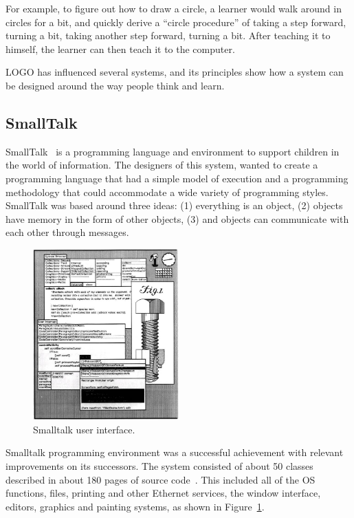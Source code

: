 For example, to figure out how to draw a circle, a learner would walk around in circles for a bit, and quickly derive a ``circle procedure'' of taking a step forward, turning a bit, taking another step forward, turning a bit. After teaching it to himself, the learner can then teach it to the computer. 

LOGO has influenced several systems, and its principles show how a system can be designed around the way people think and learn.
\subsection{SmallTalk}
\label{subsec:smalltalk}
SmallTalk~\citep{Kay1993} is a programming language and environment to support children in the world of information. The designers of this system, wanted to create a programming language that had a simple model of execution and a programming methodology that could accommodate a wide variety of programming styles. SmallTalk was based around three ideas: (1) everything is an object, (2) objects have memory in the form of other objects, (3) and objects can communicate with each other through messages.

\begin{figure}
  \centering
  \includegraphics[width=0.5\textwidth]{images/smalltalk}
    \caption{Smalltalk user interface.}
    \vspace{-20pt}  
  \label{fig:smalltalk}
\end{figure} 

Smalltalk programming environment was a successful achievement with relevant improvements on its successors. The system consisted of about 50 classes described in about 180 pages of source code~\citep{Kay1993}. This included all of the OS functions, files, printing and other Ethernet services, the window interface, editors, graphics and painting systems, as shown in Figure~\ref{fig:smalltalk}. 

